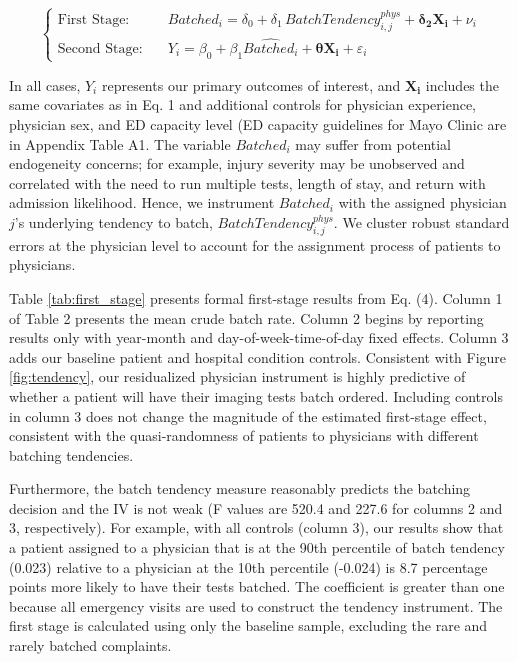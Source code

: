 \documentclass[,,nonblindrev]{informs}
\begin{document}
\begin{equation}
\left\{
\begin{aligned}
\text{First Stage:} \quad & Batched_i = \delta_0 + \delta_1 \, BatchTendency_{i,j}^{phys} + \mathbf{\delta_2 X_i} + \nu_i \\
\text{Second Stage:} \quad & Y_i = \beta_0 + \beta_1 \hat{Batched_i} + \mathbf{\theta X_i} + \varepsilon_i
\end{aligned}
\right.
\end{equation}

In all cases, \(Y_i\) represents our primary outcomes of interest, and
\(\mathbf{X_i}\) includes the same covariates as in Eq. 1 and additional
controls for physician experience, physician sex, and ED capacity level
(ED capacity guidelines for Mayo Clinic are in Appendix Table A1. The
variable \(Batched_i\) may suffer from potential endogeneity concerns;
for example, injury severity may be unobserved and correlated with the
need to run multiple tests, length of stay, and return with admission
likelihood. Hence, we instrument \(Batched_i\) with the assigned
physician \(j\)'s underlying tendency to batch,
\(BatchTendency_{i,j}^{phys}\). We cluster robust standard errors at the
physician level to account for the assignment process of patients to
physicians.

Table \ref{tab:first_stage} presents formal first-stage results from Eq.
(4). Column 1 of Table 2 presents the mean crude batch rate. Column 2
begins by reporting results only with year-month and
day-of-week-time-of-day fixed effects. Column 3 adds our baseline
patient and hospital condition controls. Consistent with Figure
\ref{fig:tendency}, our residualized physician instrument is highly
predictive of whether a patient will have their imaging tests batch
ordered. Including controls in column 3 does not change the magnitude of
the estimated first-stage effect, consistent with the quasi-randomness
of patients to physicians with different batching tendencies.

Furthermore, the batch tendency measure reasonably predicts the batching
decision and the IV is not weak (F values are 520.4 and 227.6 for
columns 2 and 3, respectively). For example, with all controls (column
3), our results show that a patient assigned to a physician that is at
the 90th percentile of batch tendency (0.023) relative to a physician at
the 10th percentile (-0.024) is 8.7 percentage points more likely to
have their tests batched. The coefficient is greater than one because
all emergency visits are used to construct the tendency instrument. The
first stage is calculated using only the baseline sample, excluding the
rare and rarely batched complaints.
\end{document}

